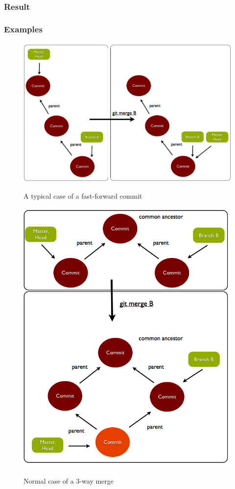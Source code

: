\subsubsection{Result}

\subsubsection{Examples}
\begin{figure} 
	\caption{A typical case of a fast-forward commit}
	\centering
	\includegraphics[scale=0.45]{images/fastforward.png}
	\label{fig:fastforward}
\end{figure}
\begin{figure} 
	\caption{Normal case of a 3-way merge}
	\centering
	\includegraphics[scale=0.45]{images/normalmerge.png}
	\label{fig:merge}
\end{figure}
